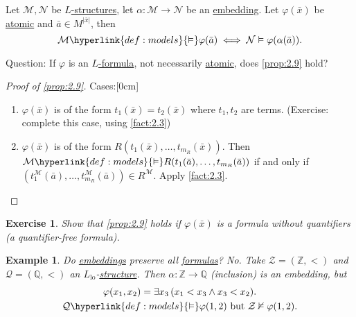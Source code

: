 \documentclass{article}
\let\models\vDash
\let\nModels\nvDash
\newtheorem{nexample}[nthm]{Example}
\newtheorem{nexercise}[nthm]{Exercise}
\begin{document}
\begin{nprop}\label{prop:2.9}
  Let $\mathcal{M}, \mathcal{N}$ be \hyperlink{def:str}{$L$-structures}, let $\alpha: \mathcal{M} \to \mathcal{N}$ be an \hyperlink{def:embedding}{embedding}.
  Let $\varphi(\bar{x})$ be \hyperlink{def:atomform}{atomic} and $\bar{a} \in M^{|\bar{x}|}$, then
  \begin{equation*}
    \mathcal{M} \hyperlink{def:models}{\models} \varphi(\bar{a}) \iff \mathcal{N} \models \varphi(\alpha(\bar{a})).
  \end{equation*}
\end{nprop}

Question: If $\varphi$ is an \hyperlink{def:form}{$L$-formula}, not necessarily \hyperlink{def:atomform}{atomic}, does \cref{prop:2.9} hold?

\begin{proof}[Proof of \cref{prop:2.9}]
  Cases:[0cm]
  \begin{enumerate}[label=(\roman*)]
    \item $\varphi(\bar{x})$ is of the form $t_1(\bar{x}) = t_2(\bar{x})$ where $t_1,t_2$ are terms.
      (Exercise: complete this case, using \cref{fact:2.3})
    \item $\varphi(\bar{x})$ is of the form $R(t_1(\bar{x}), \dotsc, t_{m_R}(\bar{x}))$.
      Then $\mathcal{M} \hyperlink{def:models}{\models} R(t_1(\bar{a}), \dotsc, t_{m_R}(\bar{a}))$ if and only if $(t_1^\mathcal{M}(\bar{a}), \dots, t_{m_R}^\mathcal{M}(\bar{a})) \in R^\mathcal{M}$. Apply \cref{fact:2.3}.
  \end{enumerate}
\end{proof}
\begin{nexercise}\label{ex:2.10}
  Show that \cref{prop:2.9} holds if $\varphi(\bar{x})$ is a formula without quantifiers (a quantifier-free formula).
\end{nexercise}
\begin{nexample}\label{ex:2.11}
  Do \hyperlink{def:embedding}{embeddings} preserve \emph{all} \hyperlink{def:form}{formulas}? No.
  Take $\mathcal{Z} = (\mathbb{Z}, <)$ and $\mathcal{Q} = (\mathbb{Q}, <)$ an \hyperlink{def:lgp}{$L_{\text{lo}}$}-\hyperlink{def:str}{structure}.
  Then $\alpha: \mathbb{Z} \to \mathbb{Q}$ (inclusion) is an embedding, but
  \begin{gather*}
    \varphi(x_1, x_2) = \exists x_3\,(x_1 < x_3 \wedge x_3 < x_2). \\
    \mathcal{Q} \hyperlink{def:models}{\models} \varphi(1,2) \text{ but } \mathcal{Z} \nModels \varphi(1,2).
  \end{gather*}
\end{nexample}
\end{document}
